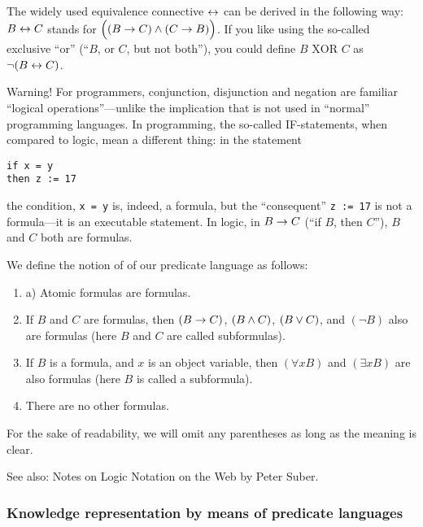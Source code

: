 The widely used equivalence connective \(\leftrightarrow\) can be derived in the following way: \(B\leftrightarrow C\) stands for \(\Big((B\rightarrow C)\wedge (C\rightarrow B)\Big)\).
If you like using the so-called exclusive ``or'' (``\(B\), or \(C\), but not both''), you could define \(B \text{ XOR } C\) as \(\neg (B\leftrightarrow C)\).

Warning! For programmers, conjunction, disjunction and negation are familiar ``logical operations''---unlike the implication that is not used in ``normal'' programming languages.
In programming, the so-called IF-statements, when compared to logic, mean a different thing: in the statement
\begin{verbatim}
if x = y
then z := 17
\end{verbatim}
the condition, \verb|x = y| is, indeed, a formula, but the ``consequent'' \verb|z := 17| is not a formula---it is an executable statement.
In logic, in \(B\rightarrow C\) (``if \(B\), then \(C\)''), \(B\) and \(C\) both are formulas.

We define the notion of  of our predicate language as follows:

\begin{enumerate}
    \item a) Atomic formulas are formulas.
    \item If \(B\) and \(C\) are formulas, then \((B\rightarrow C)\), \((B\wedge C)\), \((B\vee C)\), and \((\neg B)\) also are formulas (here \(B\) and \(C\) are called subformulas).
    \item If \(B\) is a formula, and \(x\) is an object variable, then \((\forall x B)\) and \((\exists x B)\) are also formulas (here \(B\) is called a subformula).
    \item There are no other formulas.
\end{enumerate}

\begin{remark}
For the sake of readability, we will omit any parentheses as long as the meaning is clear.
\end{remark}

See also:
Notes on Logic Notation on the Web by Peter Suber.

\subsubsection{Knowledge representation by means of predicate languages}

